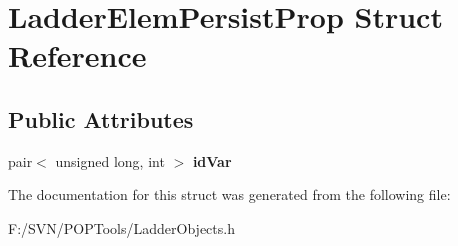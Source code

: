 \hypertarget{struct_ladder_elem_persist_prop}{\section{Ladder\-Elem\-Persist\-Prop Struct Reference}
\label{struct_ladder_elem_persist_prop}
}
\subsection*{Public Attributes}
\begin{DoxyCompactItemize}
\item 
\hypertarget{struct_ladder_elem_persist_prop_a1deaef25ec896ec2e649842de61c8058}{pair$<$ unsigned long, int $>$ {\bfseries id\-Var}}\label{struct_ladder_elem_persist_prop_a1deaef25ec896ec2e649842de61c8058}

\end{DoxyCompactItemize}


The documentation for this struct was generated from the following file\-:\begin{DoxyCompactItemize}
\item 
F\-:/\-S\-V\-N/\-P\-O\-P\-Tools/Ladder\-Objects.\-h\end{DoxyCompactItemize}
